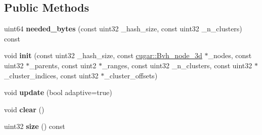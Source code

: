\subsection*{Public Methods}
\begin{DoxyCompactItemize}
\item 
\mbox{\label{struct_adaptive_clustered_r_l_storage_aa2a2ef87123b23bad7b6d11408e7a5bc}} 
uint64 {\bfseries needed\+\_\+bytes} (const uint32 \+\_\+hash\+\_\+size, const uint32 \+\_\+n\+\_\+clusters) const
\item 
\mbox{\label{struct_adaptive_clustered_r_l_storage_a806d0a4640ff52c18765e0a120886b7d}} 
void {\bfseries init} (const uint32 \+\_\+hash\+\_\+size, const \hyperlink{structcugar_1_1_bvh__node__3d}{cugar\+::\+Bvh\+\_\+node\+\_\+3d} $\ast$\+\_\+nodes, const uint32 $\ast$\+\_\+parents, const uint2 $\ast$\+\_\+ranges, const uint32 \+\_\+n\+\_\+clusters, const uint32 $\ast$\+\_\+cluster\+\_\+indices, const uint32 $\ast$\+\_\+cluster\+\_\+offsets)
\item 
\mbox{\label{struct_adaptive_clustered_r_l_storage_a39e65513aa00ef304e6dc4c05f452f47}} 
void {\bfseries update} (bool adaptive=true)
\item 
\mbox{\label{struct_adaptive_clustered_r_l_storage_a2231734e64a1c347519607ca5b075438}} 
void {\bfseries clear} ()
\item 
\mbox{\label{struct_adaptive_clustered_r_l_storage_a20b7819230c7eb2ff2c7fbbfeb52387a}} 
uint32 {\bfseries size} () const
\end{DoxyCompactItemize}
